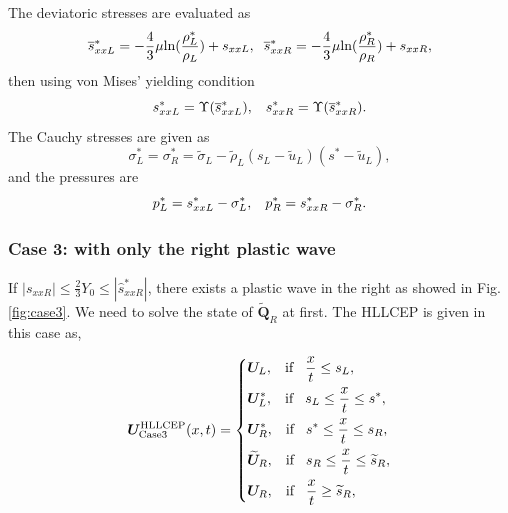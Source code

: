 \documentclass{article}
\numberwithin{equation}{section}
\numberwithin{table}{section}
\begin{document}
The deviatoric stresses are evaluated as 
\begin{equation}
  \overline{s}_{xxL}^*=-\frac{4}{3}\mu\text{ln}(\frac{\rho_L^*}{\rho_L})+s_{xxL},\hspace{0.2cm}  \overline{s}_{xxR}^*=-\frac{4}{3}\mu\text{ln}(\frac{\rho_R^*}{\rho_R})+s_{xxR},
\end{equation}
then using von Mises' yielding condition 
\begin{equation}
  s_{xxL}^* = \Upsilon(\overline{s}_{xxL}^*), \hspace{0.3cm}  s_{xxR}^* = \Upsilon(\overline{s}_{xxR}^*). 
\end{equation}
The Cauchy stresses are given as
\begin{equation}
  \sigma_L^*=\sigma_R^*=\widetilde{\sigma}_L -\widetilde{\rho}_L (s_L-\widetilde{u}_L)(s^*-\widetilde{u}_L),
\end{equation}
and the pressures are 
\begin{equation}
  p_L^* = s_{xxL}^* - \sigma_L^*, \hspace{0.3cm}   p_R^* = s_{xxR}^* - \sigma_R^*.
\end{equation}

\subsubsection {Case 3: with only the  right plastic wave}\label{sec:case3}
If  $|s_{xxR}| \le \frac{2}{3}Y_0 \le  |\hat{s}_{xxR}^*|$, there exists a plastic wave in the right as showed in Fig.\ref{fig:case3}. We need to solve the state  of $\widetilde{\bm{Q}}_R$ at first. The HLLCEP is given in this case as,

 \begin{equation}\label{eq:HLLCEP3}
   \bm{U}^{\text{HLLCEP}}_{\text{Case3}}(x,t) = \left\{ \begin{aligned}
		& \bm{U}_L, \hspace{0.3cm} \text{if} \hspace{0.3cm} \frac{x}{t}\le s_L, \\
		& \bm{U}_L^*, \hspace{0.3cm} \text{if} \hspace{0.3cm} s_L \le \frac{x}{t} \le s^*, \\
		& \bm{U}_R^*, \hspace{0.3cm} \text{if} \hspace{0.3cm} s^*\le \frac{x}{t} \le s_R, \\
		& \widetilde{\bm{U}}_R, \hspace{0.3cm} \text{if} \hspace{0.3cm} s_R \le \frac{x}{t} \le \widetilde{s}_R,\\
		& \bm{U}_R, \hspace{0.3cm} \text{if} \hspace{0.3cm} \frac{x}{t}\ge \widetilde{s}_R, \\
	  \end{aligned}
	\right.
  \end{equation}
\end{document}
